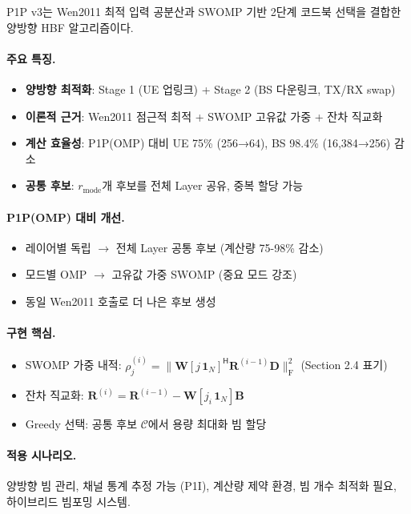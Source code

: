\documentclass[10pt]{article}
\begin{document}
P1P v3는 Wen2011 최적 입력 공분산과 SWOMP 기반 2단계 코드북 선택을 결합한 양방향 HBF 알고리즘이다.

\paragraph{주요 특징.}
\begin{itemize}
    \item \textbf{양방향 최적화}: Stage 1 (UE 업링크) + Stage 2 (BS 다운링크, TX/RX swap)
    \item \textbf{이론적 근거}: Wen2011 점근적 최적 + SWOMP 고유값 가중 + 잔차 직교화
    \item \textbf{계산 효율성}: P1P(OMP) 대비 UE 75\% (256→64), BS 98.4\% (16,384→256) 감소
    \item \textbf{공통 후보}: $r_{\text{mode}}$개 후보를 전체 Layer 공유, 중복 할당 가능
\end{itemize}

\paragraph{P1P(OMP) 대비 개선.}
\begin{itemize}
    \item 레이어별 독립 $\to$ 전체 Layer 공통 후보 (계산량 75-98\% 감소)
    \item 모드별 OMP $\to$ 고유값 가중 SWOMP (중요 모드 강조)
    \item 동일 Wen2011 호출로 더 나은 후보 생성
\end{itemize}

\paragraph{구현 핵심.}
\begin{itemize}
    \item SWOMP 가중 내적: $\rho_j^{(i)} = \|\mathbf{W}[j\,\mathbf{1}_N]^{\mathsf{H}} \mathbf{R}^{(i-1)} \mathbf{D}\|_{\text{F}}^2$ (Section 2.4 표기)
    \item 잔차 직교화: $\mathbf{R}^{(i)} = \mathbf{R}^{(i-1)} - \mathbf{W}[j_i\,\mathbf{1}_N] \mathbf{B}$
    \item Greedy 선택: 공통 후보 $\mathcal{C}$에서 용량 최대화 빔 할당
\end{itemize}

\paragraph{적용 시나리오.}
양방향 빔 관리, 채널 통계 추정 가능 (P1I), 계산량 제약 환경, 빔 개수 최적화 필요, 하이브리드 빔포밍 시스템.
\end{document}
